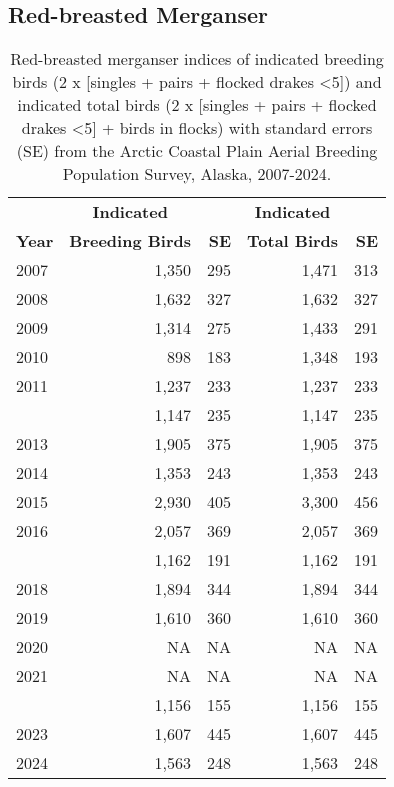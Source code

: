 \documentclass[
]{article}
\begin{document}
\subsection*{Red-breasted Merganser}\label{red-breasted-merganser-1}

\begingroup\fontsize{10}{12}\selectfont

\begin{longtable}[t]{lrrrr}

\caption{\label{tbl-RBME}Red-breasted merganser indices of indicated
breeding birds (2 x {[}singles + pairs + flocked drakes \textless5{]})
and indicated total birds (2 x {[}singles + pairs + flocked drakes
\textless5{]} + birds in flocks) with standard errors (SE) from the
Arctic Coastal Plain Aerial Breeding Population Survey, Alaska,
2007-2024.}

\tabularnewline

\\
\toprule
\multicolumn{1}{c}{\textbf{ }} & \multicolumn{1}{c}{\textbf{Indicated}} & \multicolumn{1}{c}{\textbf{ }} & \multicolumn{1}{c}{\textbf{Indicated}} & \multicolumn{1}{c}{\textbf{ }} \\
\cmidrule(l{3pt}r{3pt}){2-2} \cmidrule(l{3pt}r{3pt}){4-4}
\textbf{Year} & \textbf{Breeding Birds} & \textbf{SE} & \textbf{Total Birds} & \textbf{SE}\\
\midrule
2007 & 1,350 & 295 & 1,471 & 313\\
2008 & 1,632 & 327 & 1,632 & 327\\
2009 & 1,314 & 275 & 1,433 & 291\\
2010 & 898 & 183 & 1,348 & 193\\
2011 & 1,237 & 233 & 1,237 & 233\\
\addlinespace
2012 & 1,147 & 235 & 1,147 & 235\\
2013 & 1,905 & 375 & 1,905 & 375\\
2014 & 1,353 & 243 & 1,353 & 243\\
2015 & 2,930 & 405 & 3,300 & 456\\
2016 & 2,057 & 369 & 2,057 & 369\\
\addlinespace
2017 & 1,162 & 191 & 1,162 & 191\\
2018 & 1,894 & 344 & 1,894 & 344\\
2019 & 1,610 & 360 & 1,610 & 360\\
2020 & NA & NA & NA & NA\\
2021 & NA & NA & NA & NA\\
\addlinespace
2022 & 1,156 & 155 & 1,156 & 155\\
2023 & 1,607 & 445 & 1,607 & 445\\
2024 & 1,563 & 248 & 1,563 & 248\\
\bottomrule

\end{longtable}
\end{document}
